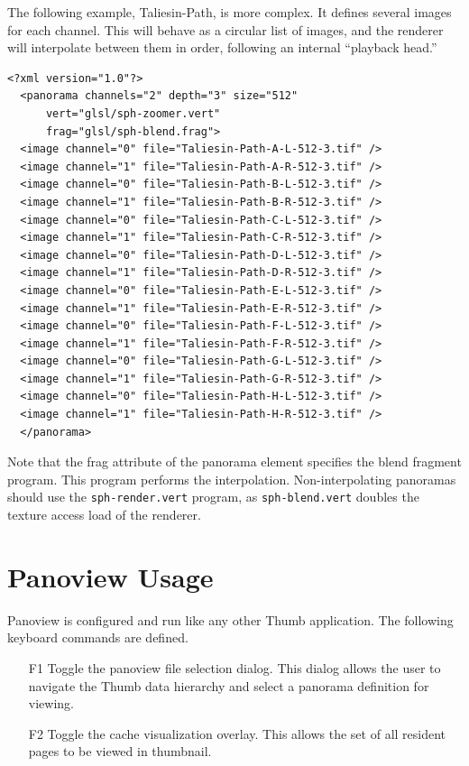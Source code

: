 \documentclass[oneside,11pt]{memoir}
\begin{document}
\begin{Spacing}{1.1}
The following example, Taliesin-Path, is more complex. It defines several images for each channel. This will behave as a circular list of images, and the renderer will interpolate between them in order, following an internal “playback head.”

\begin{verbatim}
<?xml version="1.0"?>
  <panorama channels="2" depth="3" size="512"
      vert="glsl/sph-zoomer.vert"
      frag="glsl/sph-blend.frag">
  <image channel="0" file="Taliesin-Path-A-L-512-3.tif" />
  <image channel="1" file="Taliesin-Path-A-R-512-3.tif" />
  <image channel="0" file="Taliesin-Path-B-L-512-3.tif" />
  <image channel="1" file="Taliesin-Path-B-R-512-3.tif" />
  <image channel="0" file="Taliesin-Path-C-L-512-3.tif" />
  <image channel="1" file="Taliesin-Path-C-R-512-3.tif" />
  <image channel="0" file="Taliesin-Path-D-L-512-3.tif" />
  <image channel="1" file="Taliesin-Path-D-R-512-3.tif" />
  <image channel="0" file="Taliesin-Path-E-L-512-3.tif" />
  <image channel="1" file="Taliesin-Path-E-R-512-3.tif" />
  <image channel="0" file="Taliesin-Path-F-L-512-3.tif" />
  <image channel="1" file="Taliesin-Path-F-R-512-3.tif" />
  <image channel="0" file="Taliesin-Path-G-L-512-3.tif" />
  <image channel="1" file="Taliesin-Path-G-R-512-3.tif" />
  <image channel="0" file="Taliesin-Path-H-L-512-3.tif" />
  <image channel="1" file="Taliesin-Path-H-R-512-3.tif" />
  </panorama>
\end{verbatim}

Note that the frag attribute of the panorama element specifies the blend fragment program. This program performs the interpolation. Non-interpolating panoramas should use the \texttt{sph-render.vert} program, as \texttt{sph-blend.vert} doubles the texture access load of the renderer.

\section{Panoview Usage}

Panoview is configured and run like any other Thumb application. The following keyboard commands are defined.

\begin{itemize}
\item[F1] Toggle the panoview file selection dialog. This dialog allows the user to navigate the Thumb data hierarchy and select a panorama definition for viewing.

\item[F2] Toggle the cache visualization overlay. This allows the set of all resident pages to be viewed in thumbnail.


\end{itemize}
\end{Spacing}
\end{document}
